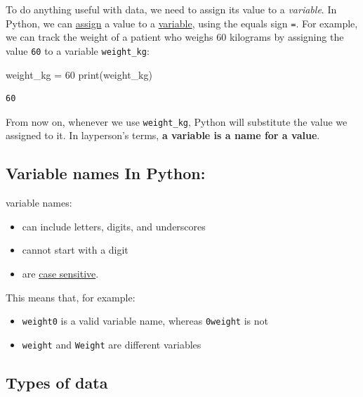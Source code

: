 \documentclass[
  letterpaper,
  DIV=11,
  numbers=noendperiod]{scrartcl}
\newenvironment{Shaded}{\begin{snugshade}}{\end{snugshade}}
\newcommand{\BuiltInTok}[1]{\textcolor[rgb]{0.00,0.23,0.31}{#1}}
\newcommand{\DecValTok}[1]{\textcolor[rgb]{0.68,0.00,0.00}{#1}}
\newcommand{\NormalTok}[1]{\textcolor[rgb]{0.00,0.23,0.31}{#1}}
\newcommand{\OperatorTok}[1]{\textcolor[rgb]{0.37,0.37,0.37}{#1}}
\providecommand{\tightlist}{%
  \setlength{\itemsep}{0pt}\setlength{\parskip}{0pt}}
\begin{document}
To do anything useful with data, we need to assign its value to a
\emph{variable}. In Python, we can
\href{../learners/reference.md\#assign}{assign} a value to a
\href{../learners/reference.md\#variable}{variable}, using the equals
sign \texttt{=}. For example, we can track the weight of a patient who
weighs 60 kilograms by assigning the value \texttt{60} to a variable
\texttt{weight\_kg}:

\begin{Shaded}
\begin{Highlighting}[]
\NormalTok{weight\_kg }\OperatorTok{=} \DecValTok{60}
\BuiltInTok{print}\NormalTok{(weight\_kg)}
\end{Highlighting}
\end{Shaded}

\begin{verbatim}
60
\end{verbatim}

From now on, whenever we use \texttt{weight\_kg}, Python will substitute
the value we assigned to it. In layperson's terms, \textbf{a variable is
a name for a value}.

\subsection{Variable names In Python:}\label{variable-names-in-python}

variable names:

\begin{itemize}
\tightlist
\item
  can include letters, digits, and underscores
\item
  cannot start with a digit
\item
  are \href{../learners/reference.md\#case-sensitive}{case sensitive}.
\end{itemize}

This means that, for example:

\begin{itemize}
\tightlist
\item
  \texttt{weight0} is a valid variable name, whereas \texttt{0weight} is
  not
\item
  \texttt{weight} and \texttt{Weight} are different variables
\end{itemize}

\subsection{Types of data}\label{types-of-data}
\end{document}
